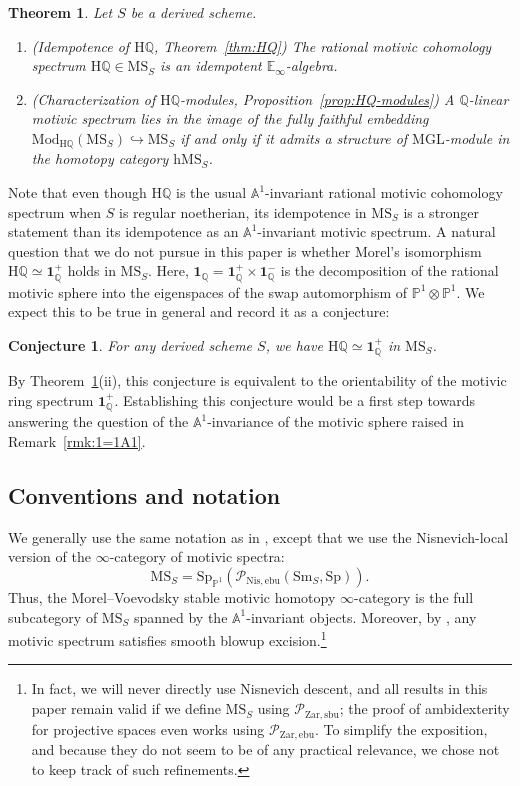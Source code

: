 \documentclass{amsart}
\numberwithin{equation}{section}
\theoremstyle{plain}
\newtheorem{theorem}[equation]{Theorem}
\newtheorem{conjecture}[equation]{Conjecture}
\theoremstyle{definition}
\let\scr=\mathcal
\let\bb=\mathbb
\def\Q{\bb Q}
\def\A{\bb A}
\def\P{\bb P}
\def\1{\mathbf 1}
\def\h{\mathrm h}
\let\into=\hookrightarrow
\def\HH{\mathrm{H}}
\def\E{\mathbb{E}}
\def\Nis{\mathrm{Nis}}
\def\Zar{\mathrm{Zar}}
\let\cat=\mathrm
\def\MGL{\mathrm{MGL}}
\def\Mod{\cat{M}\mathrm{od}{}}
\def\Sm{{\cat{S}\mathrm{m}}}
\def\MS{\mathrm{MS}}
\def\Sp{\mathrm{Sp}}
\def\sbu{\mathrm{sbu}}
\def\ebu{\mathrm{ebu}}
\begin{document}
\begin{theorem}
	\label{thm:intro-HQ}
	Let $S$ be a derived scheme.
	\begin{enumerate}
		\item \textnormal{(Idempotence of $\HH\Q$, Theorem~\ref{thm:HQ})} The rational motivic cohomology spectrum $\HH\Q\in \MS_S$ is an idempotent $\E_\infty$-algebra.
		\item \textnormal{(Characterization of $\HH\Q$-modules, Proposition~\ref{prop:HQ-modules})} A $\Q$-linear motivic spectrum lies in the image of the fully faithful embedding $\Mod_{\HH\Q}(\MS_S)\into \MS_S$ if and only if it admits a structure of $\MGL$-module in the homotopy category $\h\MS_S$.
	\end{enumerate}
\end{theorem}

Note that even though $\HH\Q$ is the usual $\A^1$-invariant rational motivic cohomology spectrum when $S$ is regular noetherian, its idempotence in $\MS_S$ is a stronger statement than its idempotence as an $\A^1$-invariant motivic spectrum. 
A natural question that we do not pursue in this paper is whether Morel's isomorphism $\HH\Q\simeq \1_\Q^+$ holds in $\MS_S$. Here, $\1_\Q=\1_\Q^+\times\1_\Q^-$ is the decomposition of the rational motivic sphere into the eigenspaces of the swap automorphism of $\P^1\otimes\P^1$.
We expect this to be true in general and record it as a conjecture:

\begin{conjecture}
	For any derived scheme $S$, we have $\HH\Q\simeq \1_\Q^+$ in $\MS_S$.
\end{conjecture}

By Theorem~\ref{thm:intro-HQ}(ii), this conjecture is equivalent to the orientability of the motivic ring spectrum $\1_\Q^+$.
Establishing this conjecture would be a first step towards answering the question of the $\A^1$-invariance of the motivic sphere raised in Remark~\ref{rmk:1=1A1}.

\subsection*{Conventions and notation}
We generally use the same notation as in \cite{AHI}, except that we use the Nisnevich-local version of the $\infty$-category of motivic spectra:
\[
\MS_S=\Sp_{\P^1}(\scr P_{\Nis,\ebu}(\Sm_S,\Sp)).
\]
Thus, the Morel–Voevodsky stable motivic homotopy $\infty$-category is the full subcategory of $\MS_S$ spanned by the $\A^1$-invariant objects.
Moreover, by \cite[Proposition 2.2]{AHI}, any motivic spectrum satisfies smooth blowup excision.\footnote{In fact, we will never directly use Nisnevich descent, and all results in this paper remain valid if we define $\MS_S$ using $\scr P_{\Zar,\sbu}$; the proof of ambidexterity for projective spaces even works using $\scr P_{\Zar,\ebu}$. To simplify the exposition, and because they do not seem to be of any practical relevance, we chose not to keep track of such refinements.}
\end{document}
